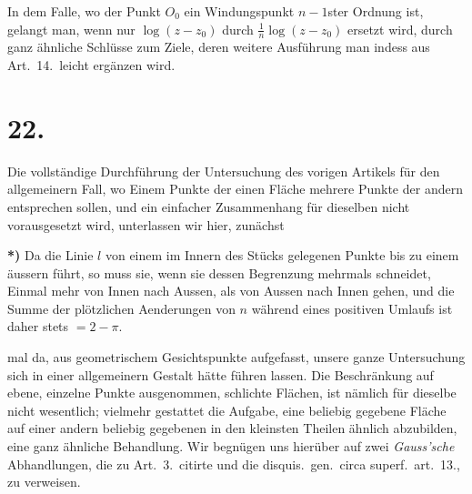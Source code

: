\documentclass{article}
\begin{document}
In dem Falle, wo der Punkt $O_0$ ein Windungspunkt $n-1$ster Ordnung ist, gelangt man, wenn nur $\log(z - z_0)$ durch $\frac{1}{n}\log(z - z_0)$ ersetzt wird, durch ganz ähnliche Schlüsse zum Ziele, deren weitere Ausführung man indess aus Art.~14.\ leicht ergänzen wird.

\section*{22.}

Die vollständige Durchführung der Untersuchung des vorigen Artikels für den allgemeinern Fall, wo Einem Punkte der einen Fläche mehrere Punkte der andern entsprechen sollen, und ein einfacher Zusammenhang für dieselben nicht vorausgesetzt wird, unterlassen wir hier, zunächst

\textbf{*)} Da die Linie $l$ von einem im Innern des Stücks gelegenen Punkte bis zu einem äussern führt, so muss sie, wenn sie dessen Begrenzung mehrmals schneidet, Einmal mehr von Innen nach Aussen, als von Aussen nach Innen gehen, und die Summe der plötzlichen Aenderungen von $n$ während eines positiven Umlaufs ist daher stets $= 2 - \pi$.

mal da, aus geometrischem Gesichtspunkte aufgefasst, unsere ganze Untersuchung sich in einer allgemeinern Gestalt hätte führen lassen. Die Beschränkung auf ebene, einzelne Punkte ausgenommen, schlichte Flächen, ist nämlich für dieselbe nicht wesentlich; vielmehr gestattet die Aufgabe, eine beliebig gegebene Fläche auf einer andern beliebig gegebenen in den kleinsten Theilen ähnlich abzubilden, eine ganz ähnliche Behandlung. Wir begnügen uns hierüber auf zwei \emph{Gauss'sche} Abhandlungen, die zu Art.~3.\ citirte und die disquis.\ gen.\ circa superf.\ art.~13., zu verweisen.
\end{document}
